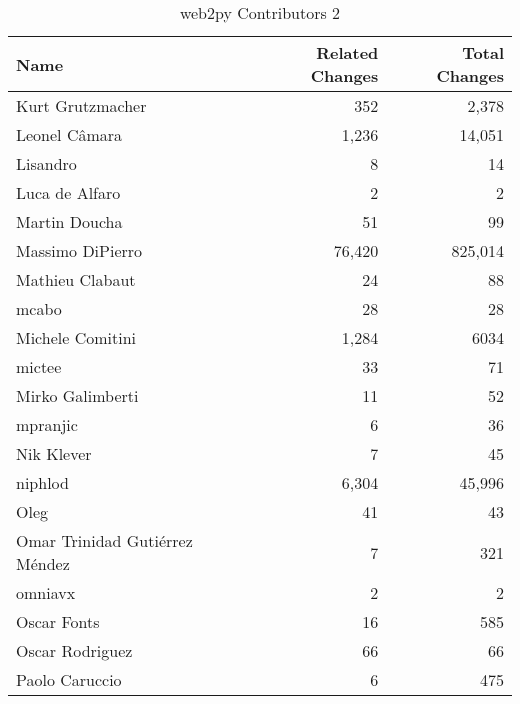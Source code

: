 \documentclass[a4paper,man,natbib,floatsintext]{apa6}
\begin{document}
\begin{table}[ht]
\caption{web2py Contributors 2}
\label{tab:contribs-3-2}
\begin{tabular}{|l|r|r|}
\hline
Name                           & Related Changes & Total Changes \\ \hline
Kurt Grutzmacher               & 352             & 2,378         \\ \hline
Leonel Câmara                  & 1,236           & 14,051        \\ \hline
Lisandro                       & 8               & 14            \\ \hline
Luca de Alfaro                 & 2               & 2             \\ \hline
Martin Doucha                  & 51              & 99            \\ \hline
Massimo DiPierro               & 76,420          & 825,014       \\ \hline
Mathieu Clabaut                & 24              & 88            \\ \hline
mcabo                          & 28              & 28            \\ \hline
Michele Comitini               & 1,284           & 6034          \\ \hline
mictee                         & 33              & 71            \\ \hline
Mirko Galimberti               & 11              & 52            \\ \hline
mpranjic                       & 6               & 36            \\ \hline
Nik Klever                     & 7               & 45            \\ \hline
niphlod                        & 6,304           & 45,996        \\ \hline
Oleg                           & 41              & 43            \\ \hline
Omar Trinidad Gutiérrez Méndez & 7               & 321           \\ \hline
omniavx                        & 2               & 2             \\ \hline
Oscar Fonts                    & 16              & 585           \\ \hline
Oscar Rodriguez                & 66              & 66            \\ \hline
Paolo Caruccio                 & 6               & 475           \\ \hline

\end{tabular}
\end{table}
\end{document}
